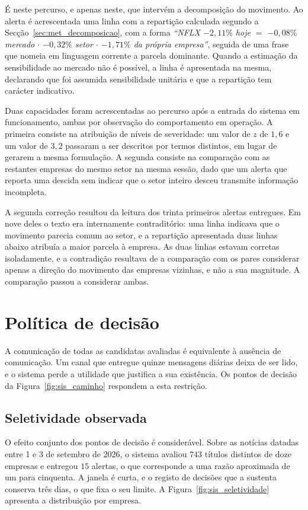 É neste percurso, e apenas neste, que intervém a decomposição do movimento. Ao alerta é acrescentada
uma linha com a repartição calculada segundo a Secção~\ref{sec:met_decomposicao}, com a forma
\emph{``NFLX $-2{,}11\%$ hoje $=$ $-0{,}08\%$ mercado $\cdot$ $-0{,}32\%$ setor $\cdot$
$-1{,}71\%$ da própria empresa''}, seguida de uma frase que nomeia em linguagem corrente a parcela
dominante. Quando a estimação da sensibilidade ao mercado não é possível, a linha é apresentada na
mesma, declarando que foi assumida sensibilidade unitária e que a repartição tem carácter
indicativo.

Duas capacidades foram acrescentadas ao percurso após a entrada do sistema em funcionamento, ambas
por observação do comportamento em operação. A primeira consiste na atribuição de níveis de
severidade: um valor de $z$ de $1{,}6$ e um valor de $3{,}2$ passaram a ser descritos por termos
distintos, em lugar de gerarem a mesma formulação. A segunda consiste na comparação com as
restantes empresas do mesmo setor na mesma sessão, dado que um alerta que reporta uma descida sem
indicar que o setor inteiro desceu transmite informação incompleta.

A segunda correção resultou da leitura dos trinta primeiros alertas entregues. Em nove deles o
texto era internamente contraditório: uma linha indicava que o movimento parecia comum ao setor, e
a repartição apresentada duas linhas abaixo atribuía a maior parcela à empresa. As duas linhas
estavam corretas isoladamente, e a contradição resultava de a comparação com os pares considerar
apenas a direção do movimento das empresas vizinhas, e não a sua magnitude. A comparação passou a
considerar ambas.

\section{Política de decisão}
\label{sec:sis_politica}

A comunicação de todas as candidatas avaliadas é equivalente à ausência de comunicação. Um canal
que entregue quinze mensagens diárias deixa de ser lido, e o sistema perde a utilidade que
justifica a sua existência. Os pontos de decisão da Figura~\ref{fig:sis_caminho} respondem a esta
restrição.

\subsection{Seletividade observada}

O efeito conjunto dos pontos de decisão é considerável. Sobre as notícias datadas entre 1 e 3 de
setembro de 2026, o sistema avaliou $743$ títulos distintos de doze empresas e entregou $15$
alertas, o que corresponde a uma razão aproximada de um para cinquenta. A janela é curta, e o
registo de decisões que a sustenta conserva três dias, o que fixa o seu limite. A
Figura~\ref{fig:sis_seletividade} apresenta a distribuição por empresa.

